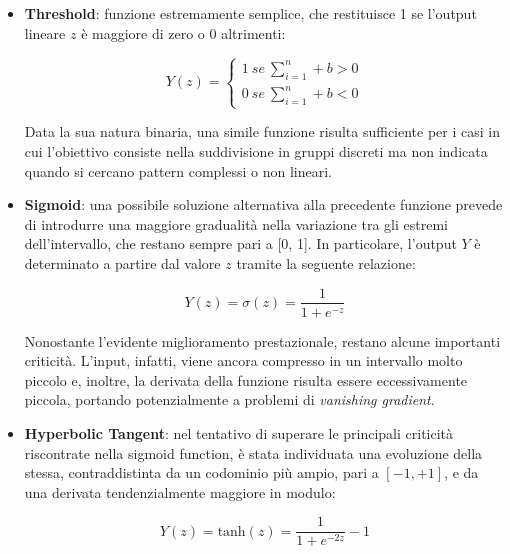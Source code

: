 \begin{itemize}

    \item \textbf{Threshold}: funzione estremamente semplice, che restituisce 1 se l'output lineare $z$ è maggiore di zero o 0 altrimenti:
    
    \begin{center}
        \begin{equation}
            Y(z) = \begin{cases}
                1 \ se \ \sum_{i=1}^{n} + b  > 0 \\
                0 \ se \ \sum_{i=1}^{n} + b  < 0
            \end{cases}
            \label{eq:threshold}
        \end{equation}
    \end{center}
    
    Data la sua natura binaria, una simile funzione risulta sufficiente per i casi in cui l'obiettivo consiste nella suddivisione in gruppi discreti ma non indicata quando si cercano pattern complessi o non lineari.
    
    \item \textbf{Sigmoid}: una possibile soluzione alternativa alla precedente funzione prevede di introdurre una maggiore gradualità nella variazione tra gli estremi dell'intervallo, che restano sempre pari a [0, 1]. In particolare, l'output $Y$ è determinato a partire dal valore $z$ tramite la seguente relazione:
    
        \begin{equation}
            Y(z) = \sigma (z) = \displaystyle \frac{1}{1 + e^{-z}}
            \label{eq:sigmoid}
        \end{equation}
    
    Nonostante l'evidente miglioramento prestazionale, restano alcune importanti criticità. L'input, infatti, viene ancora compresso in un intervallo molto piccolo e, inoltre, la derivata della funzione risulta essere eccessivamente piccola, portando potenzialmente a problemi di \textit{vanishing gradient}.

    \item \textbf{Hyperbolic Tangent}: nel tentativo di superare le principali criticità riscontrate nella sigmoid function, è stata individuata una evoluzione della stessa, contraddistinta da un codominio più ampio, pari a $[-1, +1]$, e da una derivata tendenzialmente maggiore in modulo:
    
        \begin{equation}
            Y(z) = \text{tanh}(z) = \displaystyle \frac{1}{1 + e^{-2z}} - 1
            \label{eq:hyperbolic}
        \end{equation}
    

\end{itemize}

